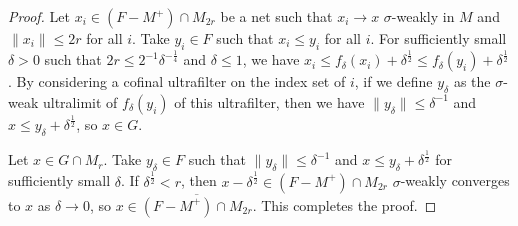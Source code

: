 \documentclass[noamsfonts,a4paper,10pt]{amsart}
\theoremstyle{plain}
\theoremstyle{definition}
\begin{document}
\begin{proof}
Let $x_i\in (F-M^+)\cap M_{2r}$ be a net such that $x_i\to x$ $\sigma$-weakly in $M$ and $\|x_i\|\le2r$ for all $i$.
Take $y_i\in F$ such that $x_i\le y_i$ for all $i$.
For sufficiently small $\delta>0$ such that $2r\le2^{-1}\delta^{-\frac14}$ and $\delta\le1$, we have $x_i\le f_\delta(x_i)+\delta^{\frac12}\le f_\delta(y_i)+\delta^{\frac12}$.
By considering a cofinal ultrafilter on the index set of $i$, if we define $y_\delta$ as the $\sigma$-weak ultralimit of $f_\delta(y_i)$ of this ultrafilter, then we have $\|y_\delta\|\le\delta^{-1}$ and $x\le y_\delta+\delta^{\frac12}$, so $x\in G$.

Let $x\in G\cap M_r$.
Take $y_\delta\in F$ such that $\|y_\delta\|\le\delta^{-1}$ and $x\le y_\delta+\delta^{\frac12}$ for sufficiently small $\delta$.
If $\delta^{\frac12}<r$, then $x-\delta^{\frac12}\in(F-M^+)\cap M_{2r}$ $\sigma$-weakly converges to $x$ as $\delta\to0$, so $x\in\overline{(F-M^+)\cap M_{2r}}$.
This completes the proof.
\end{proof}
\end{document}
